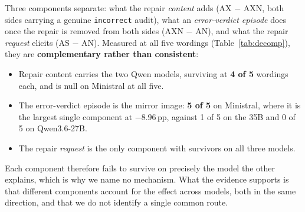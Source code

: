 \documentclass[11pt]{article}
\newcommand{\pp}{\,\text{pp}}
\begin{document}
Three components separate: what the repair \emph{content} adds (AX $-$ AXN, both sides carrying a
genuine \texttt{incorrect} audit), what an \emph{error-verdict episode} does once the repair is removed
from both sides (AXN $-$ AN), and what the repair \emph{request} elicits (AS $-$ AN). Measured at all
five wordings (Table~\ref{tab:decomp}), they are \textbf{complementary rather than consistent}:

\begin{itemize}[topsep=2pt,itemsep=1pt,leftmargin=*]
\item Repair content carries the two Qwen models, surviving at \textbf{4 of 5} wordings each, and is
  null on Ministral at all five.
\item The error-verdict episode is the mirror image: \textbf{5 of 5} on Ministral, where it is the
  largest single component at $-8.96\pp$, against 1 of 5 on the 35B and 0 of 5 on Qwen3.6-27B.
\item The repair \emph{request} is the only component with survivors on all three models.
\end{itemize}

Each component therefore fails to survive on precisely the model the other explains, which is why we
name no mechanism. What the evidence supports is that different components account for the effect
across models, both in the same direction, and that we do not identify a single common route.
\end{document}
